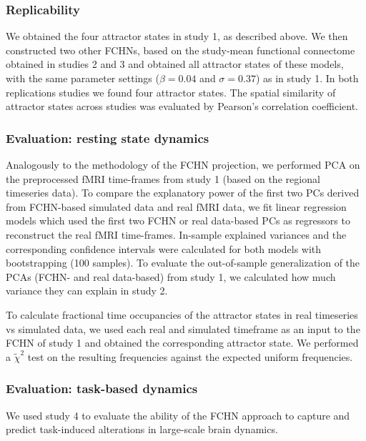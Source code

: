 \documentclass{article}
\begin{document}
\subsubsection{Replicability}\label{Replicability}

We obtained the four attractor states in study 1, as described above. We then constructed two other FCHNs, based on the study-mean functional connectome obtained in studies 2 and 3 and  obtained all attractor states of these models, with the same parameter settings ($\beta = 0.04$ and $\sigma = 0.37$) as in study 1. In both replications studies we found four attractor states. The spatial similarity of attractor states across studies was evaluated by Pearson's correlation coefficient.

\subsubsection{Evaluation: resting state dynamics}\label{Evaluation: resting state dynamics}

Analogously to the methodology of the FCHN projection, we performed PCA on the preprocessed fMRI time-frames from study 1 (based on the regional timeseries data).
To compare the explanatory power of the first two PCs derived from FCHN-based simulated data and real fMRI data, we fit linear regression models which used the first two FCHN or real data-based PCs as regressors to reconstruct the real fMRI time-frames. In-sample explained variances and the corresponding confidence intervals were calculated for both models with bootstrapping (100 samples). To evaluate the out-of-sample generalization of the PCAs (FCHN- and real data-based) from study 1, we calculated how much variance they can explain in study 2.

To calculate fractional time occupancies of the attractor states in real timeseries vs simulated data, we used each real and simulated timeframe as an input to the FCHN of study 1 and obtained the corresponding attractor state. We performed a $\tilde{\chi}^2$ test on the resulting frequencies against the expected uniform frequencies.

\subsubsection{Evaluation: task-based dynamics}\label{Evaluation: task-based dynamics}

We used study 4 to evaluate the ability of the FCHN approach to capture and predict task-induced alterations in large-scale brain dynamics.
\end{document}
